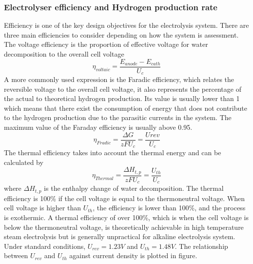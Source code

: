 \subsubsection{Electrolyser efficiency and Hydrogen production rate}  
Efficiency is one of the key design objectives for the electrolysis system. There are three main efficiencies to consider depending on how the system is assessment. The voltage efficiency is the proportion of effective voltage for water decomposition to the overall cell voltage
\begin{equation}
\eta_{voltaic} = \frac{E_{anode} - E_{cath} }{U_c}
\end{equation}
A more commonly used expression is the Faradic efficiency, which relates the reversible voltage to the overall cell voltage, it also represents the percentage of the actual to theoretical hydrogen production. Its value is usually lower than 1 which means that there exist the consumption of energy that does not contribute to the hydrogen production due to the parasitic currents in the system. The maximum value of the Faraday efficiency is usually above 0.95.
\begin{equation}
\eta_{Fradic} = \frac{\Delta G}{zFU_c} = \frac{U{rev}}{U_c} 
\end{equation}
The thermal efficiency takes into account the thermal energy and can be calculated by
\begin{equation}
\eta_{Thermal} = \frac{\Delta H_{t,p}}{zFU_c} = \frac{U_{th}}{U_c} 
\end{equation} 
where $\Delta H_{t,p}$ is the enthalpy change of water decomposition. The thermal efficiency is 100\% if the cell voltage is equal to the thermoneutral voltage. When cell voltage is higher than $U_{th}$, the efficiency is lower than 100\%, and the process is exothermic. A thermal efficiency of over 100\%, which is when the cell voltage is below the thermoneutral voltage,  is theoretically achievable in high temperature steam electrolysis but is generally unpractical for alkaline electrolysis system. Under standard conditions, $U_{rev} = 1.23V$ and $U_{th} = 1.48V$. The relationship between $U_{rev}$ and $U_{th}$ against current density is plotted in figure.
